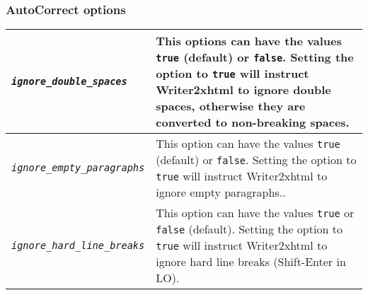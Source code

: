 \documentclass{article}
\newcommand\textstyleSourceText[1]{\texttt{\textmd{#1}}}
\begin{document}
\subsubsection{AutoCorrect options}
\begin{center}
\begin{tabular}{|l|l|}

\hline
\mdseries \textstyleSourceText{\emph{ignore\_double\_spaces}} & \mdseries This options can have the values \textstyleSourceText{true} (default) or \textstyleSourceText{false}. Setting the option to \textstyleSourceText{true} will instruct Writer2xhtml to ignore double spaces, otherwise they are converted to non-breaking spaces.\\\hline
\mdseries \textstyleSourceText{\emph{ignore\_empty\_paragraphs}} & \mdseries This option can have the values \textstyleSourceText{true} (default) or \textstyleSourceText{false}. Setting the option to \textstyleSourceText{true} will instruct Writer2xhtml to ignore empty paragraphs..\\\hline
\mdseries \textstyleSourceText{\emph{ignore\_hard\_line\_breaks}} & \mdseries This option can have the values \textstyleSourceText{true} or \textstyleSourceText{false} (default). Setting the option to \textstyleSourceText{true} will instruct Writer2xhtml to ignore hard line breaks (Shift-Enter in LO).\\\hline
\end{tabular}
\end{center}
\end{document}
